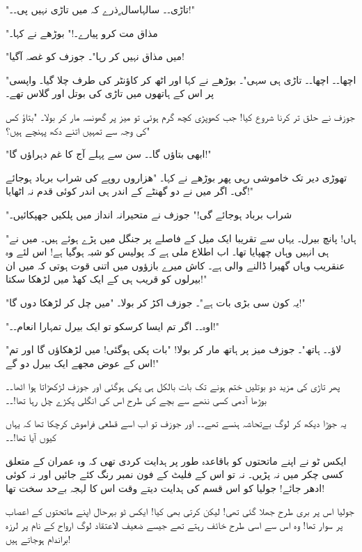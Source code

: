 "تاڑی۔۔ سالہاسال ٍذرے کہ میں تاڑی نہیں پی۔۔!"

"مذاق مت کرو پیارے۔!" بوڑھے نے کہا۔

"میں مذاق نہیں کر رہا"۔ جوزف کو غصہ آگیا!

"اچھا۔۔ اچھا۔۔ تاڑی ہی سہی"۔ بوڑھے نے کہا اور اٹھ کر کاؤنٹر کی طرف چلا گیا۔ واپسی پر اس کے ہاتھوں میں تاڑی کی بوتل اور گلاس تھے۔

جوزف نے حلق تر کرنا شروع کیا! جب کھوپڑی کچھ گرم ہوئی تو میز پر گھونسہ مار کر بولا۔ "بتاؤ کس کی وجہ سے تمہیں اتنے دکھ پہنچے ہیں؟"

"ابھی بتاؤں گا۔۔ سن سے پہلے آج کا غم دہراؤں گا!"

تھوڑی دیر تک خاموشی رہی پھر بوڑھے نے کہا۔ "هزاروں روپے کی شراب برباد ہوجائے گی۔ اگر میں نے دو گھنٹے کے اندر ہی اندر کوئی قدم نہ اٹھایا!"

"شراب برباد ہوجائے گی!" جوزف نے متحیرانہ انداز میں پلکیں جھپکائیں۔

"ہاں! پانچ بیرل۔ یہاں سے تقریبا ایک میل کے فاصلے پر جنگل میں پڑے ہوئے ہیں۔ میں نے ہی انہیں وہاں چھپایا تھا۔ اب اطلاع ملی ہے کہ پولیس کو شبہ ہوگیا ہے! اس لئے وہ عنقریب وہاں گھیرا ڈالنے والی ہے۔ کاش میرے بازؤوں میں اتنی قوت ہوتی کہ میں ان بیرلوں کو قریب ہی کے ایک کھڈ میں لڑھکا سکتا!"

"یہ کون سی بڑی بات ہے"۔ جوزف اکڑ کر بولا۔ "میں چل کر لڑھکا دوں گا!"

"اوہ۔۔ اگر تم ایسا کرسکو تو ایک بیرل تمہارا انعام۔۔!"

"لاؤ۔۔ ہاتھ"۔ جوزف میز پر ہاتھ مار کر بولا! "بات پکی ہوگئی! میں لڑھکاؤں گا اور تم اس کے عوض مجھے ایک بیرل دو گے!"

پھر تاڑی کی مزید دو بوتلیں ختم ہونے تک بات بالکل ہی پکی ہوگئی اور جوزف لڑکھڑاتا ہوا اٹھا۔۔ بوڑھا آدمی کسی ننھے سے بچے کی طرح اس کی انگلی پکڑے چل رہا تھا!۔۔

یہ جوڑا دیکھ کر لوگ بےتحاشہ ہنسے تھے۔۔ اور جوزف تو اب اسے قطعی فراموش کرچکا تھا کہ یہاں کیوں آیا تھا!۔۔

\endR

\bigskip\bigskip\bigskip
\centerline{}
\bigskip\bigskip\bigskip
\beginR
\body


ایکس ٹو نے اپنے ماتحتوں کو باقاعدہ طور پر ہدایت کردی تھی کہ وہ عمران کے متعلق کسی چکر میں نہ پڑیں۔ نہ تو اس کے فلیٹ کے فون نمبر رنگ کئے جائیں اور نہ کوئی ادھر جائے! جولیا کو اس قسم کی ہدایت دیتے وقت اس کا لہجہ بےحد سخت تھا!

جولیا اس پر بری طرح جھلا گئی تھی! لیکن کرتی بھی کیا! ایکس ٹو بہرحال اپنے ماتحتوں کے اعصاب پر سوار تھا! وہ اس سے اسی طرح خائف رہتے تھے جیسے ضعیف الاعتقاد لوگ ارواح کے نام پر لرزہ براندام ہوجاتے ہیں!

